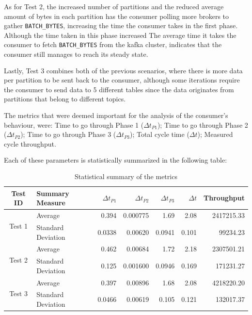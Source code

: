 As for Test 2, the increased number of partitions and the reduced average amount
    of bytes in each partition has the consumer polling more brokers to gather
    \lstinline[language=Python]{BATCH_BYTES}, increasing the time the consumer
    takes in the first phase. Although the time taken in this phase increased
    The average time it takes the consumer to fetch
    \lstinline[language=Python]{BATCH_BYTES} from the kafka cluster, indicates
    that the consumer still manages to reach its steady state.

Lastly, Test 3 combines both of the previous scenarios, where there is more data
    per partition to be sent back to the consumer, although some iterations
    require the consumer to send data to 5 different tables since the data
    originates from partitions that belong to different topics.

The metrics that were deemed important for the analysis of the consumer's
    behaviour, were: Time to go through Phase 1 ($\Delta t_{P1}$); Time to go
    through Phase 2 ($\Delta t_{P2}$); Time to go through Phase 3 ($\Delta
    t_{P3}$); Total cycle time ($\Delta t$); Measured cycle throughput.

Each of these parameters is statistically summarized in the following table:
    \begin{table}[H] \centering \caption{Statistical summary of the metrics }
        \begin{tabular}{ |c|l|r|r|r|r|r| } \hline \textbf{Test ID} &
            \textbf{Summary Measure} & \textbf{$\Delta t_{P1}$} &
            \textbf{$\Delta t_{P2}$} & \textbf{$\Delta t_{P3}$} &
            \textbf{$\Delta t$} & \textbf{Throughput} \\ \hline
            \multirow{2}{*}{Test 1} & Average            & 0.394  & 0.000775 &
            1.69   & 2.08 &                              2417215.33 \\ &
            Standard Deviation & 0.0338 & 0.00620  & 0.0941 & 0.101 & 99234.23
            \\ \hline \multirow{2}{*}{Test 2} & Average            & 0.462  &
            0.00684 & 1.72 & 2.18 &                                 2307501.21
            \\ &  Standard Deviation & 0.125 & 0.001600  & 0.0946 & 0.169 &
            171231.27 \\ \hline \multirow{2}{*}{Test 3} & Average            &
            0.397  & 0.00896 & 1.68   & 2.08 &
            4218220.20 \\ &  Standard Deviation & 0.0466 & 0.00619  & 0.105 &
        0.121 & 132017.37 \\ \hline \end{tabular} \end{table}

